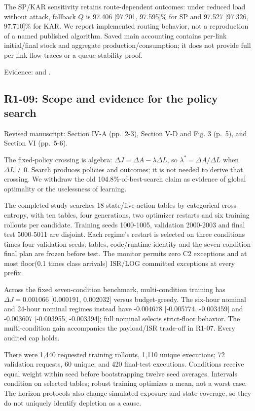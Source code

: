 \documentclass[a4paper,11pt]{article}
\begin{document}
The SP/KAR sensitivity retains route-dependent outcomes: under reduced load without attack, fallback \(Q\) is 97.406 {[}97.201, 97.595{]}\% for SP and 97.527 {[}97.326, 97.710{]}\% for KAR. We report implemented routing behavior, not a reproduction of a named published algorithm. Saved main accounting contains per-link initial/final stock and aggregate production/consumption; it does not provide full per-link flow traces or a queue-stability proof.

Evidence:  and .

\subsection{R1-09: Scope and evidence for the policy search}\label{r1-09-scope-and-evidence-for-the-policy-search}

Revised manuscript: Section IV-A (pp.~2-3), Section V-D and Fig. 3 (p.~5), and Section VI (pp.~5-6).

The fixed-policy crossing is algebra: \(\Delta J=\Delta A-\lambda\Delta L\), so \(\lambda^\ast=\Delta A/\Delta L\) when \(\Delta L\ne0\). Search produces policies and outcomes; it is not needed to derive that crossing. We withdraw the old 104.8\%-of-best-search claim as evidence of global optimality or the uselessness of learning.

The completed study searches 18-state/five-action tables by categorical cross-entropy, with ten tables, four generations, two optimizer restarts and six training rollouts per candidate. Training seeds 1000-1005, validation 2000-2003 and final test 5000-5011 are disjoint. Each regime's restart is selected on three conditions times four validation seeds; tables, code/runtime identity and the seven-condition final plan are frozen before test. The monitor permits zero C2 exceptions and at most floor(0.1 times class arrivals) ISR/LOG committed exceptions at every prefix.

Across the fixed seven-condition benchmark, multi-condition training has \(\Delta J=0.001066\) {[}0.000191, 0.002032{]} versus budget-greedy. The six-hour nominal and 24-hour nominal regimes instead have -0.004678 {[}-0.005774, -0.003459{]} and -0.003607 {[}-0.003955, -0.003394{]}; full nominal selects strict-floor behavior. The multi-condition gain accompanies the payload/ISR trade-off in R1-07. Every audited cap holds.

There were 1,440 requested training rollouts, 1,110 unique executions; 72 validation requests, 60 unique; and 420 final-test executions. Conditions receive equal weight within seed before bootstrapping twelve seed averages. Intervals condition on selected tables; robust training optimizes a mean, not a worst case. The horizon protocols also change simulated exposure and state coverage, so they do not uniquely identify depletion as a cause.
\end{document}
